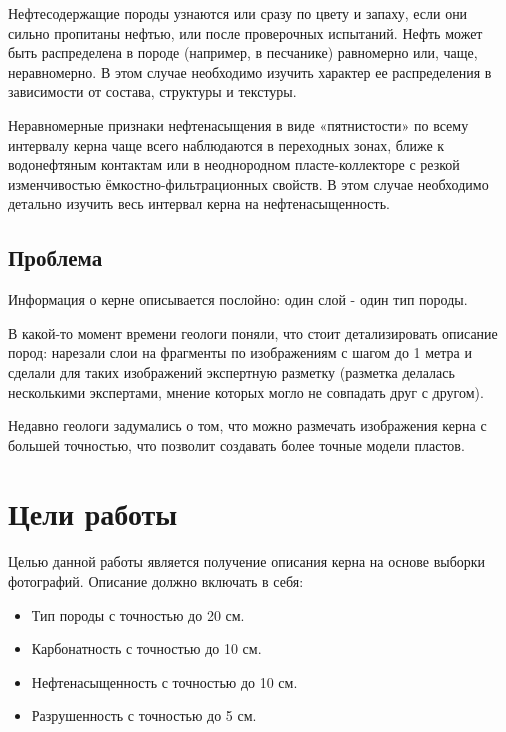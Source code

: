 \documentclass[14pt]{matmex-diploma}
\begin{document}
        Нефтесодержащие породы узнаются или сразу по цвету и запаху, если они сильно пропитаны нефтью, или после проверочных испытаний. Нефть может быть распределена в породе (например, в песчанике) равномерно или, чаще, неравномерно. В этом случае необходимо изучить характер ее распределения в зависимости от состава, структуры и текстуры.
        
        Неравномерные признаки нефтенасыщения в виде «пятнистости» по всему интервалу керна чаще всего наблюдаются в переходных зонах, ближе к водонефтяным контактам или в неоднородном пласте-коллекторе с резкой изменчивостью ёмкостно-фильтрационных свойств. В этом случае необходимо детально изучить весь интервал керна на нефтенасыщенность. \cite{paper:oil}
        
    \subsection*{Проблема}
        
        Информация о керне описывается послойно: один слой - один тип породы.
        
        В какой-то момент времени геологи поняли, что стоит детализировать описание пород: нарезали слои на фрагменты по изображениям с шагом до 1 метра и сделали для таких изображений экспертную разметку (разметка делалась несколькими экспертами, мнение которых могло не совпадать друг с другом).
        
        Недавно геологи задумались о том, что можно размечать изображения керна с большей точностью, что позволит создавать более точные модели пластов.


\section{Цели работы}

    Целью данной работы является получение описания керна на основе выборки фотографий. Описание должно включать в себя:
    
    \begin{itemize}
        \item Тип породы с точностью до 20 см. 
        \item Карбонатность с точностью до 10 см.
        \item Нефтенасыщенность с точностью до 10 см.
        \item Разрушенность с точностью до 5 см.
    \end{itemize}
    
\end{document}
